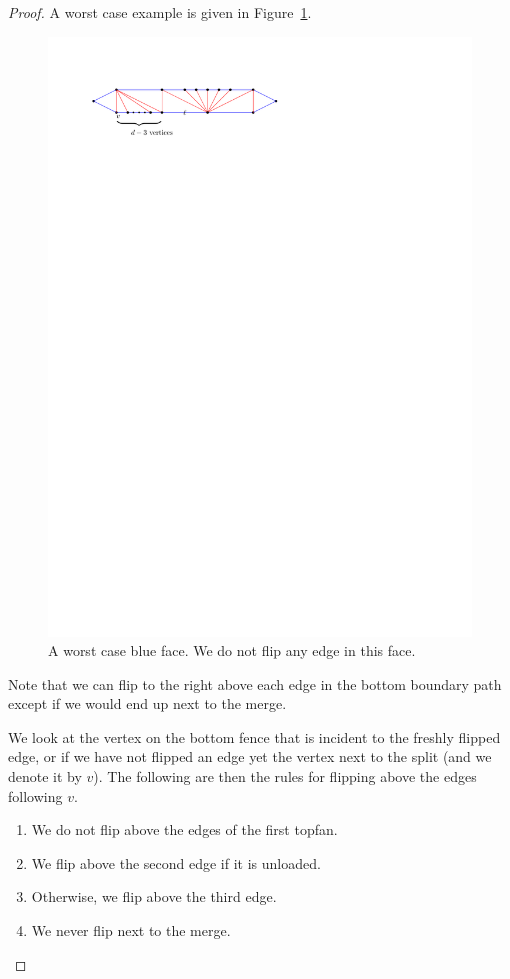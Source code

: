   \begin{proof}
  A worst case example is given in Figure~\ref{fig:subdiv:worstCaseWithTopFan}.

  \begin{figure}[b]
    \centering
    \includegraphics[scale=1]{blueFaceSubdivision/img/worstCaseWithTopFan}
    \caption{A worst case blue face. We do not flip any edge in this face.}
    \label{fig:subdiv:worstCaseWithTopFan}
  \end{figure}

  Note that we can flip to the right above each edge in the bottom boundary path except if we would end up next to the merge.

  We look at the vertex on the bottom fence that is incident to the freshly flipped edge, or if we have not flipped an edge yet the vertex next to the split (and we denote it by $v$). The following are then the rules for flipping above the edges following $v$.
  \begin{enumerate}
    \item We do not flip above the edges of the first topfan.
    \item We flip above the second edge if it is unloaded.
    \item Otherwise, we flip above the third edge.
    \item We never flip next to the merge.
  \end{enumerate}


\end{proof}

